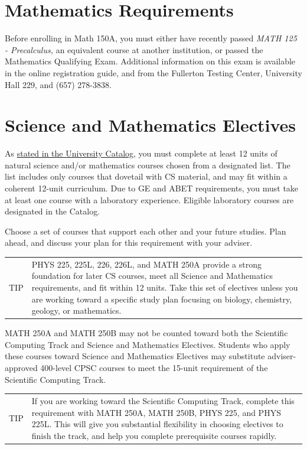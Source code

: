\documentclass{book}
\newenvironment{tip}{
  \tcolorbox \begin{tabular}{m{.5in} m{5in}} \Large{TIP} &
}{
  \end{tabular} \endtcolorbox
}
\begin{document}
\section{Mathematics Requirements}

Before enrolling in Math 150A, you must either have recently passed \emph{MATH 125 - Precalculus,} an equivalent course at another institution, or passed the Mathematics Qualifying Exam. Additional information on this exam is available in the online registration guide, and from the Fullerton Testing Center, University Hall 229, and (657) 278-3838.

\section{Science and Mathematics Electives}

As \href{http://catalog.fullerton.edu/preview_program.php?catoid=2&poid=537&returnto=137}{stated in the University Catalog}, you must complete at least 12 units of natural science and/or mathematics courses chosen from a designated list. The list includes only courses that dovetail with CS material, and may fit within a coherent 12-unit curriculum. Due to GE and ABET requirements, you must take at least one course with a laboratory experience. Eligible laboratory courses are designated in the Catalog.

Choose a set of courses that support each other and your future studies. Plan ahead, and discuss your plan for this requirement with your adviser.

\begin{tip}
PHYS 225, 225L, 226, 226L, and MATH 250A provide a strong foundation for later CS courses, meet all Science and Mathematics requirements, and fit within 12 units. Take this set of electives unless you are working toward a specific study plan focusing on biology, chemistry, geology, or mathematics.
\end{tip}

MATH 250A and MATH 250B may not be counted toward both the Scientific Computing Track \ScTrackIndex and Science and Mathematics Electives. Students who apply these courses toward Science and Mathematics Electives may substitute adviser-approved 400-level CPSC courses to meet the 15-unit requirement of the Scientific Computing Track.

\begin{tip}
If you are working toward the Scientific Computing Track, complete this requirement with  MATH 250A, MATH 250B, PHYS 225, and PHYS 225L. This will give you substantial flexibility in choosing electives to finish the track, and help you complete prerequisite courses rapidly.
\end{tip}
\end{document}
